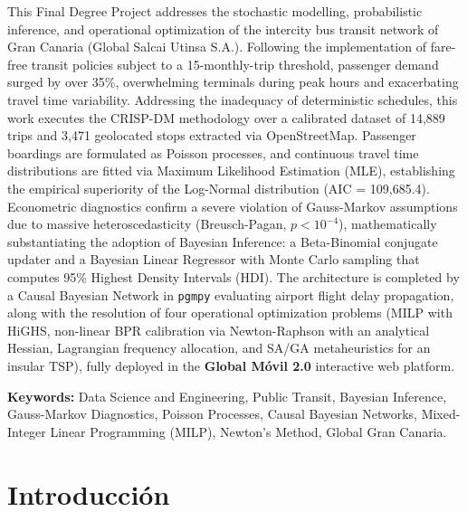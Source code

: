 \documentclass[11pt,a4paper,twoside]{report}
\begin{document}
This Final Degree Project addresses the stochastic modelling, probabilistic inference, and operational optimization of the intercity bus transit network of Gran Canaria (Global Salcai Utinsa S.A.). Following the implementation of fare-free transit policies subject to a 15-monthly-trip threshold, passenger demand surged by over 35\%, overwhelming terminals during peak hours and exacerbating travel time variability. Addressing the inadequacy of deterministic schedules, this work executes the CRISP-DM methodology over a calibrated dataset of 14,889 trips and 3,471 geolocated stops extracted via OpenStreetMap. Passenger boardings are formulated as Poisson processes, and continuous travel time distributions are fitted via Maximum Likelihood Estimation (MLE), establishing the empirical superiority of the Log-Normal distribution (AIC = 109,685.4). Econometric diagnostics confirm a severe violation of Gauss-Markov assumptions due to massive heteroscedasticity (Breusch-Pagan, $p < 10^{-4}$), mathematically substantiating the adoption of Bayesian Inference: a Beta-Binomial conjugate updater and a Bayesian Linear Regressor with Monte Carlo sampling that computes 95\% Highest Density Intervals (HDI). The architecture is completed by a Causal Bayesian Network in \texttt{pgmpy} evaluating airport flight delay propagation, along with the resolution of four operational optimization problems (MILP with HiGHS, non-linear BPR calibration via Newton-Raphson with an analytical Hessian, Lagrangian frequency allocation, and SA/GA metaheuristics for an insular TSP), fully deployed in the \textbf{Global Móvil 2.0} interactive web platform.

\vspace{0.8cm}
\noindent\textbf{Keywords:} Data Science and Engineering, Public Transit, Bayesian Inference, Gauss-Markov Diagnostics, Poisson Processes, Causal Bayesian Networks, Mixed-Integer Linear Programming (MILP), Newton's Method, Global Gran Canaria.

\tableofcontents
\listoffigures
\listoftables

\newpage
{}

\chapter{Introducción}
\end{document}
